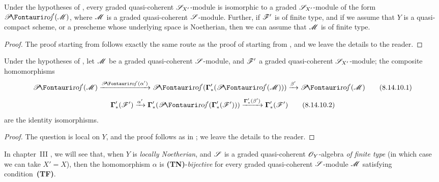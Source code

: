 \begin{corollary}[8.14.9]
\label{II.8.14.9}
Under the hypotheses of , every graded quasi-coherent $\mathscr{S}_{X'}$-module is isomorphic to a graded $\mathscr{S}_{X'}$-module of the form $\shProj'(\sh{M})$, where $\mathscr{M}$ is a graded quasi-coherent $\mathscr{S}$-module.
Further, if $\mathscr{F}'$ is of finite type, and if we assume that $Y$ is a quasi-compact scheme, or a prescheme whose underlying space is Noetherian, then we can assume that $\mathscr{M}$ is of finite type.
\end{corollary}

\begin{proof}
The proof starting from  follows exactly the same route as the proof of  starting from , and we leave the details to the reader.
\end{proof}

\begin{proposition}[8.14.10]
\label{II.8.14.10}
Under the hypotheses of , let $\mathscr{M}$ be a graded quasi-coherent $\mathscr{S}$-module, and $\mathscr{F}'$ a graded quasi-coherent $\mathscr{S}_{X'}$-module;
the composite homomorphisms
\[
\label{II.8.14.10.1}
    \shProj'(\sh{M})
    \xrightarrow{\shProj'(\alpha')}
    \shProj'(\boldsymbol{\Gamma}'_*(\shProj'(\sh{M})))
    \xrightarrow{\beta'}
    \shProj'(\sh{M})
\tag{8.14.10.1}
\]
\[
\label{II.8.14.10.2}
    \boldsymbol{\Gamma}'_*(\sh{F}')
    \xrightarrow{\alpha'}
    \boldsymbol{\Gamma}'_*(\shProj'(\boldsymbol{\Gamma}'_*(\sh{F}')))
    \xrightarrow{\boldsymbol{\Gamma}'_*(\beta')}
    \boldsymbol{\Gamma}'_*(\sh{F}')
\tag{8.14.10.2}
\]
are the identity isomorphisms.
\end{proposition}

\begin{proof}
The question is local on $Y$, and the proof follows as in ;
we leave the details to the reader.
\end{proof}

\begin{remark}[8.14.11]
\label{II.8.14.11}
In chapter~III , we will see that, when $Y$ is \emph{locally Noetherian}, and $\mathscr{S}$ is a graded quasi-coherent $\mathscr{O}_Y$-algebra \emph{of finite type} (in which case
we can take $X'=X$), then the homomorphism $\alpha$  is \textbf{(TN)}-\emph{bijective} for every graded quasi-coherent $\mathscr{S}$-module $\mathscr{M}$ satisfying condition~\textbf{(TF)}.
\end{remark}

